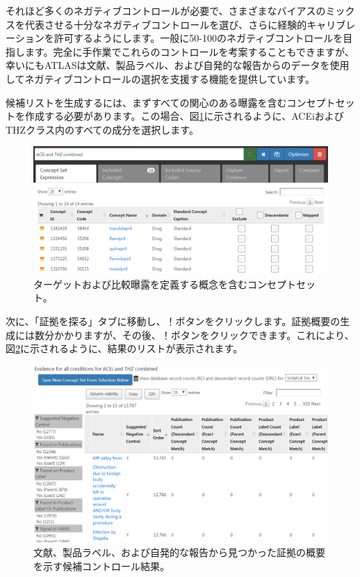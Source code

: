\documentclass[
  11pt]{book}
\theoremstyle{definition}
\theoremstyle{definition}
\theoremstyle{definition}
\theoremstyle{definition}
\theoremstyle{remark}
\begin{document}
それほど多くのネガティブコントロールが必要で、さまざまなバイアスのミックスを代表させる十分なネガティブコントロールを選び、さらに経験的キャリブレーションを許可するようにします。一般に50-100のネガティブコントロールを目指します。完全に手作業でこれらのコントロールを考案することもできますが、幸いにもATLASは文献、製品ラベル、および自発的な報告からのデータを使用してネガティブコントロールの選択を支援する機能を提供しています。

候補リストを生成するには、まずすべての関心のある曝露を含むコンセプトセットを作成する必要があります。この場合、図\ref{fig:exposuresConceptSet}に示されるように、ACEiおよびTHZクラス内のすべての成分を選択します。

\begin{figure}

{\centering \includegraphics[width=1\linewidth]{images/MethodValidity/exposuresConceptSet} 

}

\caption{ターゲットおよび比較曝露を定義する概念を含むコンセプトセット。}\label{fig:exposuresConceptSet}
\end{figure}

次に、「証拠を探る」タブに移動し、！\href{images/MethodValidity/generate.png}{}ボタンをクリックします。証拠概要の生成には数分かかりますが、その後、！\href{images/MethodValidity/viewEvidence.png}{}ボタンをクリックできます。これにより、図\ref{fig:candidateNcs}に示されるように、結果のリストが表示されます。

\begin{figure}

{\centering \includegraphics[width=1\linewidth]{images/MethodValidity/candidateNcs} 

}

\caption{文献、製品ラベル、および自発的な報告から見つかった証拠の概要を示す候補コントロール結果。}\label{fig:candidateNcs}
\end{figure}
\end{document}
